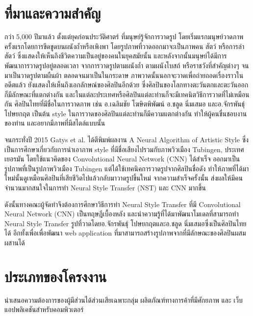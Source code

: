 \documentclass[12pt,oneside,openright,a4paper]{cpe-thai-project}
\begin{document}
\section{ที่มาและความสำคัญ}

\par\setlength{\parindent}{5ex}กว่า 5,000 ปีมาแล้ว ตั้งแต่ยุคก่อนประวัติศาตร์ ที่มนุษย์รู้จักการวาดรูป โดยเริ่มแรกมนุษย์วาดภาพครั้งแรกโดยการขีดขูดบนผนังถ้ำหรือเพิงพา โดยรูปภาพที่วาดออกมาจะเป็นภาพคน สัตว์ หรือการล่าสัตว์ ซึ่งแสดงให้เห็นถึงชีวิตความเป็นอยู่ของคนในยุคสมัยนั้น และหลังจากนั้นมนุษย์ได้มีการพัฒนาการวาดรูปอยู่ตลอดเวลา จากการวาดรูปตามผนังถ้ำ ตามผนังโบสถ์ หรือราชวังที่สำคัญต่างๆ จนมาเป็นวาดรูปตามผืนผ้า ตลอดจนมาเป็นในกระดาษ ภาพวาดนั้นนอกจะวาดเพื่อถ่ายถอดเรื่องราวในอดีตแล้ว ยังแสดงให้เห็นถึงเอกลักษณ์ของศิลปินอีกด้วย ซึ่งศิลปินของโลกทางตะวันตกและตะวันออกก็มีลักษณะที่แตกต่างกัน และในแต่ละประเทศหรือศิลปินแต่ละท่านก็จะมีเทคนิตวิธีการวาดที่ไม่เหมือนกัน ศิลปินไทยที่มีชื่อในการวาดภาพ เช่น อ.เฉลิมชัย โฆษิตพิพัฒน์ อ.ชลูด นิ่มเสมอ และอ.จักรพันธุ์ โปษยกฤต เป็นต้น style ในการวาดของศิลปินแต่ละท่านก็มีความแตกต่างกัน ทำให้ผู้คนชื่นชอบงานของท่าน และอยากมีภาพที่มีสไตล์แบบนั้น 
\par\setlength{\parindent}{5ex}จนกระทั่งปี 2015 Gatys et al. ได้ตีพิมพ์ผลงาน A Neural Algorithm of Artistic Style ซึ่งเป็นการศึกษาเกี่ยวกับการนำเอาภาพ style ที่มีชื่อเสียงไปรวมกับภาพวิวเมือง Tubingen, ประเทศเยอรมัน โดยใช้แนวคิดของ Convolutional Neural Network (CNN)  ได้สำเร็จ ออกมาเป็นรูปภาพที่เป็นรูปภาพวิวเมือง Tubingen แต่ได้ใช้เทคนิคการวาดรูปจากศิลปินชื่อดัง ทำให้ภาพที่ได้มาใหม่นั้นดูเหมือนศิลปินที่เสียชีวิตไปแล้วกลับมาวาดรูปขึ้นใหม่ จากความสำเร็จครั้งนั้น ส่งผลให้มีคนจำนวนมากสนใจในการทำ Neural Style Transfer (NST) และ CNN มากขึ้น
\par\setlength{\parindent}{5ex}ดังนั้นทางคณะผู้จัดทำจึงต้องการศึกษาวิธีการทำ Neural Style Transfer ที่มี Convolutional Neural Network (CNN) เป็นทฤษฎีเบื้องหลัง และนำความรู้ที่ได้มาพัฒนาโมเดลที่สามารถทำ Neural Style Transfer รูปที่วาดโดยอ.จักรพันธุ์ โปษยกฤตและอ.ชลูด นิ่มเสมอซึ่งเป็นศิลปินไทยได้ อีกทั้งเพื่อเพื่อพัฒนา web application ที่มาสามารถสร้างรูปภาพจากที่มีลักษณะของศิลปินผสมผสานได้

\section{ประเภทของโครงงาน}
\par\setlength{\parindent}{5ex}นําเสนอความต้องการของผู้มีส่วนได้ส่วนเสียเฉพาะกลุ่ม ผลิตภัณฑ์ทางการค้าที่มีศักยภาพ และ เว็บแอปพลิเคชันสำหรับคอมพิวเตอร์
\end{document}
